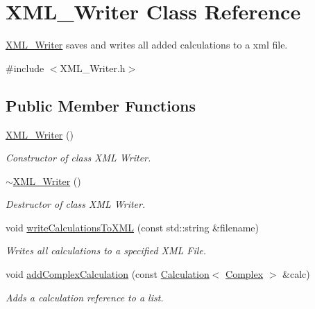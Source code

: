 \hypertarget{class_x_m_l___writer}{}\section{X\+M\+L\+\_\+\+Writer Class Reference}
\label{class_x_m_l___writer}


\mbox{\hyperlink{class_x_m_l___writer}{X\+M\+L\+\_\+\+Writer}} saves and writes all added calculations to a xml file.  




{\ttfamily \#include $<$X\+M\+L\+\_\+\+Writer.\+h$>$}

\subsection*{Public Member Functions}
\begin{DoxyCompactItemize}
\item 
\mbox{\hyperlink{class_x_m_l___writer_a03d206e93a428ab3f8aabca766f52fd1}{X\+M\+L\+\_\+\+Writer}} ()
\begin{DoxyCompactList}\small\item\em Constructor of class X\+ML Writer. \end{DoxyCompactList}\item 
\mbox{\hyperlink{class_x_m_l___writer_a6aa6724b6d44ecc4c5f1e2348d82e6f3}{$\sim$\+X\+M\+L\+\_\+\+Writer}} ()
\begin{DoxyCompactList}\small\item\em Destructor of class X\+ML Writer. \end{DoxyCompactList}\item 
void \mbox{\hyperlink{class_x_m_l___writer_a69eba4821f47637350804b7af1be5928}{write\+Calculations\+To\+X\+ML}} (const std\+::string \&filename)
\begin{DoxyCompactList}\small\item\em Writes all calculations to a specified X\+ML File. \end{DoxyCompactList}\item 
void \mbox{\hyperlink{class_x_m_l___writer_a4fb5ce350559fcfd8142fb8c9f31325e}{add\+Complex\+Calculation}} (const \mbox{\hyperlink{class_calculation}{Calculation}}$<$ \mbox{\hyperlink{class_complex}{Complex}} $>$ \&calc)
\begin{DoxyCompactList}\small\item\em Adds a calculation reference to a list. \end{DoxyCompactList}\end{DoxyCompactItemize}


